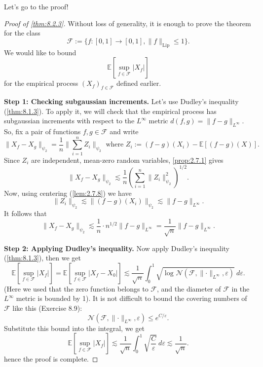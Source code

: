 Let's go to the proof!
\begin{proof}[Proof of \cref{thm:8.2.3}]
Without loss of generality, it is enough to prove the theorem for the class
\[ \mathcal{F} := \{ f: [0, 1] \to [0, 1], \lVert f \rVert_{\mathrm{Lip}} \leq 1 \}. \]
We would like to bound 
\[ \mathbb{E}\left[ \sup_{f \in \mathcal{F}}|X_f| \right] \]
for the empirical process $(X_f)_{f \in \mathcal{F}}$ defined earlier.

\textbf{Step 1: Checking subgaussian increments.} Let's use Dudley's inequality (\cref{thm:8.1.3}). To apply 
it, we will check that the empirical process has subgaussian increments with respect to the $L^{\infty}$ metric 
$d(f, g) = \lVert f - g \rVert_{L^\infty}$. So, fix a pair of functions $f, g \in \mathcal{F}$ and write 
\[ \lVert X_f - X_g \rVert_{\psi_2} = \frac{1}{n}\lVert \sum_{i = 1}^{n}Z_i \rVert_{\psi_2} 
\text{ where } Z_i := (f-g)(X_i) - \mathbb{E}\left[ (f-g)(X) \right]. \]
Since $Z_i$ are independent, mean-zero random variables, \cref{prop:2.7.1} gives
\[ \lVert X_f - X_g \rVert_{\psi_2} \lesssim \frac{1}{n}\left( \sum_{i = 1}^{n} 
\lVert Z_i \rVert_{\psi_2}^2 \right)^{1/2}. \]
Now, using centering (\cref{lem:2.7.8}) we have 
\[ \lVert Z_i \rVert_{\psi_2} \lesssim \lVert (f - g)(X_i) \rVert_{\psi_2} \lesssim 
\lVert f - g \rVert_{L^\infty}. \]
It follows that 
\[ \lVert X_f - X_g \rVert_{\psi_2} \lesssim \frac{1}{n} \cdot n^{1/2}\lVert f - g \rVert_{L^\infty} 
= \frac{1}{\sqrt{n}} \lVert f - g \rVert_{L^{\infty}}. \]

\textbf{Step 2: Applying Dudley's inequality.} Now apply Dudley's inequality (\cref{thm:8.1.3}), then we get 
\[ \mathbb{E}\left[ \sup_{f \in \mathcal{F}}|X_f| \right] = 
\mathbb{E}\left[ \sup_{f \in \mathcal{F}}|X_f - X_0| \right] \lesssim 
\frac{1}{\sqrt{n}} \int_{0}^{1} \sqrt{\log_{}{\mathcal{N}(\mathcal{F}, \lVert \cdot \rVert_{L^\infty}, 
\varepsilon)}} \ d \varepsilon. \]
(Here we used that the zero function belongs to $\mathcal{F}$, and the diameter of $\mathcal{F}$ in the 
$L^\infty$ metric is bounded by 1). It is not difficult to bound the covering numbers of $\mathcal{F}$ like 
this (Exercise 8.9):
\[ \mathcal{N}(\mathcal{F}, \lVert \cdot \rVert_{L^\infty}, \varepsilon) \leq e^{C/\varepsilon}. \]
Substitute this bound into the integral, we get 
\[ \mathbb{E}\left[ \sup_{f \in \mathcal{F}}|X_f| \right] \lesssim \frac{1}{\sqrt{n}} 
\int_{0}^{1} \sqrt{\frac{C}{\varepsilon}} \ d \varepsilon \lesssim \frac{1}{\sqrt{n}}. \]
hence the proof is complete.
\end{proof}


